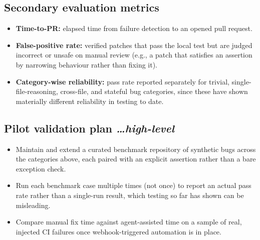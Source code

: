 \documentclass[11pt,a4paper]{article}
\newcommand{\BvrHint}[1]{%
  {\normalfont\normalsize\itshape\hfill #1}}
\begin{document}
\subsection{Secondary evaluation metrics}
\begin{itemize}[leftmargin=0.7cm]
    \item \textbf{Time-to-PR:} elapsed time from failure detection
      to an opened pull request.
    \item \textbf{False-positive rate:} verified patches that pass
      the local test but are judged incorrect or unsafe on manual
      review (e.g., a patch that satisfies an assertion by
      narrowing behaviour rather than fixing it).
    \item \textbf{Category-wise reliability:} pass rate reported
      separately for trivial, single-file-reasoning, cross-file, and
      stateful bug categories, since these have shown materially
      different reliability in testing to date.
\end{itemize}

\subsection{Pilot validation plan %
\BvrHint{\ldots high-level}}
\begin{itemize}[leftmargin=0.7cm]
    \item Maintain and extend a curated benchmark repository of
      synthetic bugs across the categories above, each paired with
      an explicit assertion rather than a bare exception check.
    \item Run each benchmark case multiple times (not once) to
      report an actual pass rate rather than a single-run result,
      which testing so far has shown can be misleading.
    \item Compare manual fix time against agent-assisted time on a
      sample of real, injected CI failures once webhook-triggered
      automation is in place.
\end{itemize}
\end{document}
